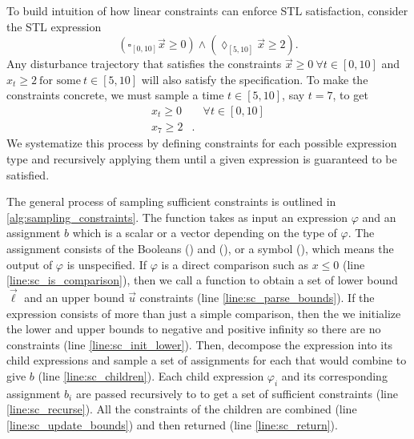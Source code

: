 To build intuition of how linear constraints can enforce STL satisfaction, consider the STL expression 
\begin{equation} 
(\square_{[0,10]} \vec{x} \geq 0) \land (\lozenge_{[5,10]} \vec{x} \geq 2) \text{.}
\end{equation}
Any disturbance trajectory that satisfies the constraints $\vec{x} \geq 0 \ \forall t \in [0,10]$ and $x_t \geq 2 \ \text{for some} \ t \in [5, 10]$ will also satisfy the specification. To make the constraints concrete, we must sample a time $t \in [5,10]$, say $t=7$, to get
\begin{equation}
\begin{split}
    x_t \geq 0 &\quad \forall t \in [0, 10] \\
    x_7 \geq 2 &\text{.}
\end{split}
\end{equation}
We systematize this process by defining constraints for each possible expression type and recursively applying them until a given expression is guaranteed to be satisfied. 

The general process of sampling sufficient constraints is outlined in \cref{alg:sampling_constraints}. The function takes as input an expression $\varphi$ and an assignment $b$ which is a scalar or a vector depending on the type of $\varphi$. The assignment consists of the Booleans \True{} (\T) and \False{} (\F), or a symbol \Arbitrary{} (\A), which means the output of $\varphi$ is unspecified. If $\varphi$ is a direct comparison such as $x \leq 0$ (line \ref{line:sc_is_comparison}), then we call a function  to obtain a set of lower bound $\vec{\ell}$ and an upper bound $\vec{u}$ constraints (line \ref{line:sc_parse_bounds}). If the expression consists of more than just a simple comparison, then the we initialize the lower and upper bounds to negative and positive infinity so there are no constraints (line \ref{line:sc_init_lower}). Then, decompose the expression into its child expressions and sample a set of assignments for each that would combine to give $b$ (line \ref{line:sc_children}). Each child expression $\varphi_i$ and its corresponding assignment $b_i$ are passed recursively to  to get a set of sufficient constraints (line \ref{line:sc_recurse}). All the constraints of the children are combined (line \ref{line:sc_update_bounds}) and then returned (line \ref{line:sc_return}). 

